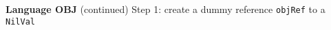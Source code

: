 \begin{minipage}[t]{\sw}
\slidenumber
\LARGE
{\bf Language OBJ} (continued)\exx
Step 1: create a dummy reference \verb'objRef' to a \verb'NilVal'\exx
\centerline{}
\end{minipage}
